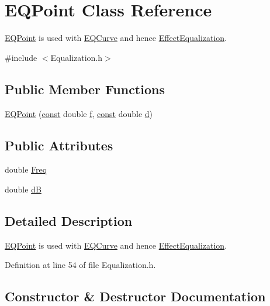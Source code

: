 \hypertarget{class_e_q_point}{}\section{E\+Q\+Point Class Reference}
\label{class_e_q_point}


\hyperlink{class_e_q_point}{E\+Q\+Point} is used with \hyperlink{class_e_q_curve}{E\+Q\+Curve} and hence \hyperlink{class_effect_equalization}{Effect\+Equalization}.  




{\ttfamily \#include $<$Equalization.\+h$>$}

\subsection*{Public Member Functions}
\begin{DoxyCompactItemize}
\item 
\hyperlink{class_e_q_point_a442cd59c4223c5351f5e83c417fd46dd}{E\+Q\+Point} (\hyperlink{getopt1_8c_a2c212835823e3c54a8ab6d95c652660e}{const} double \hyperlink{checksum_8c_ae747d72a1a803f5ff4a4b2602857d93b}{f}, \hyperlink{getopt1_8c_a2c212835823e3c54a8ab6d95c652660e}{const} double \hyperlink{poly-fir_8h_a2530554172d8629149ec56816eeaa947}{d})
\end{DoxyCompactItemize}
\subsection*{Public Attributes}
\begin{DoxyCompactItemize}
\item 
double \hyperlink{class_e_q_point_a3bc7cbb54bad107185c13a90625dbc4b}{Freq}
\item 
double \hyperlink{class_e_q_point_a6eb1fdeca18a6f743222513f17152484}{dB}
\end{DoxyCompactItemize}


\subsection{Detailed Description}
\hyperlink{class_e_q_point}{E\+Q\+Point} is used with \hyperlink{class_e_q_curve}{E\+Q\+Curve} and hence \hyperlink{class_effect_equalization}{Effect\+Equalization}. 

Definition at line 54 of file Equalization.\+h.



\subsection{Constructor \& Destructor Documentation}

